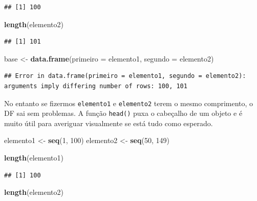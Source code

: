 \documentclass[
]{article}
\newenvironment{Shaded}{\begin{snugshade}}{\end{snugshade}}
\newcommand{\DataTypeTok}[1]{\textcolor[rgb]{0.13,0.29,0.53}{#1}}
\newcommand{\DecValTok}[1]{\textcolor[rgb]{0.00,0.00,0.81}{#1}}
\newcommand{\KeywordTok}[1]{\textcolor[rgb]{0.13,0.29,0.53}{\textbf{#1}}}
\newcommand{\NormalTok}[1]{#1}
\newcommand{\StringTok}[1]{\textcolor[rgb]{0.31,0.60,0.02}{#1}}
\begin{document}
\begin{verbatim}
## [1] 100
\end{verbatim}

\begin{Shaded}
\begin{Highlighting}[]
\KeywordTok{length}\NormalTok{(elemento2)}
\end{Highlighting}
\end{Shaded}

\begin{verbatim}
## [1] 101
\end{verbatim}

\begin{Shaded}
\begin{Highlighting}[]
\NormalTok{base <-}\StringTok{ }\KeywordTok{data.frame}\NormalTok{(}\DataTypeTok{primeiro =}\NormalTok{ elemento1,}
                  \DataTypeTok{segundo =}\NormalTok{ elemento2)}
\end{Highlighting}
\end{Shaded}

\begin{verbatim}
## Error in data.frame(primeiro = elemento1, segundo = elemento2): arguments imply differing number of rows: 100, 101
\end{verbatim}

No entanto se fizermos \texttt{elemento1} e \texttt{elemento2} terem o
mesmo comprimento, o DF sai sem problemas. A função \texttt{head()} puxa
o cabeçalho de um objeto e é muito útil para averiguar visualmente se
está tudo como esperado.

\begin{Shaded}
\begin{Highlighting}[]
\NormalTok{elemento1 <-}\StringTok{ }\KeywordTok{seq}\NormalTok{(}\DecValTok{1}\NormalTok{, }\DecValTok{100}\NormalTok{)}
\NormalTok{elemento2 <-}\StringTok{ }\KeywordTok{seq}\NormalTok{(}\DecValTok{50}\NormalTok{, }\DecValTok{149}\NormalTok{)}

\KeywordTok{length}\NormalTok{(elemento1)}
\end{Highlighting}
\end{Shaded}

\begin{verbatim}
## [1] 100
\end{verbatim}

\begin{Shaded}
\begin{Highlighting}[]
\KeywordTok{length}\NormalTok{(elemento2)}
\end{Highlighting}
\end{Shaded}
\end{document}
